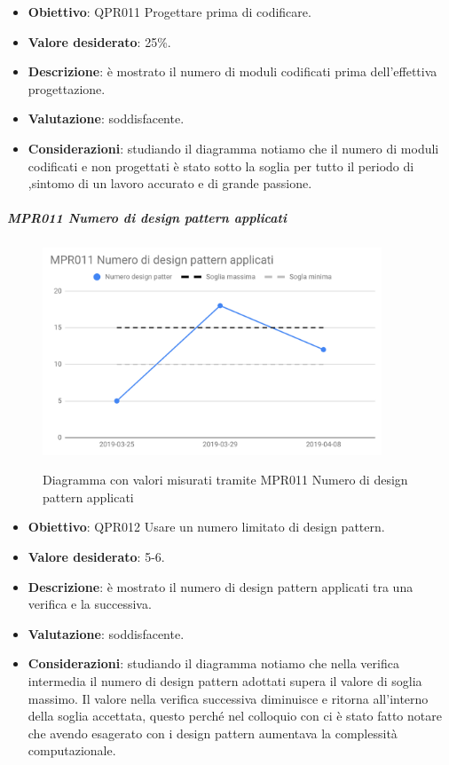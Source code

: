 	\begin{itemize}
		\item \textbf{Obiettivo}: QPR011 Progettare prima di codificare.
		\item \textbf{Valore desiderato}: 25\%.
		\item \textbf{Descrizione}: è mostrato il numero di moduli codificati prima dell'effettiva progettazione.
		\item \textbf{Valutazione}: soddisfacente.
		\item \textbf{Considerazioni}: studiando il diagramma notiamo che il numero di moduli codificati e non progettati
		è stato sotto la soglia per tutto il periodo di \RQ,sintomo di un lavoro accurato e di grande passione.
	\end{itemize}

	\subparagraph{MPR011 Numero di design pattern applicati}
	
	\begin{figure}[H]
		\centering
		\includegraphics[width=0.9\textwidth]{img/cruscotti/RQ/MPR011.png}
		\label{immagineNumDesignPatternRQ}
		\caption{Diagramma con valori misurati tramite MPR011 Numero di design pattern applicati}
	\end{figure}
	
	\begin{itemize}
		\item \textbf{Obiettivo}: QPR012 Usare un numero limitato di design pattern.
		\item \textbf{Valore desiderato}: 5-6.
		\item \textbf{Descrizione}: è mostrato il numero di design pattern applicati tra una verifica e la successiva.
		\item \textbf{Valutazione}: soddisfacente.
		\item \textbf{Considerazioni}: studiando il diagramma notiamo che nella verifica intermedia il numero di design
		pattern adottati supera il valore di soglia massimo. Il valore nella verifica successiva diminuisce e ritorna
		all'interno della soglia accettata, questo perché nel colloquio con \RC ci è stato fatto notare che avendo
		esagerato con i design pattern aumentava la complessità computazionale.
	\end{itemize}

